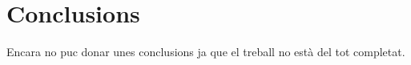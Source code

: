\thispagestyle{empty}
\part*{Conclusions}

Encara no puc donar unes conclusions ja que el treball no està del tot completat.